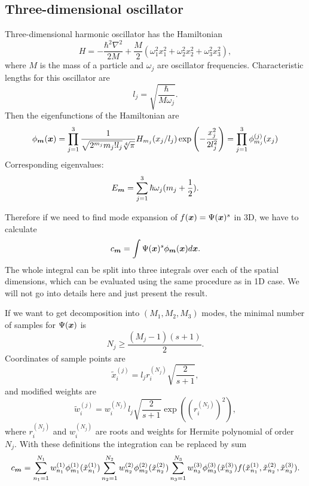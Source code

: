 \subsection{Three-dimensional oscillator}

Three-dimensional harmonic oscillator has the Hamiltonian
\[
	H = -\frac{\hbar^2 \nabla^2}{2 M}
		+ \frac{M}{2} (
			\omega_1^2 x_1^2 + \omega_2^2 x_2^2 + \omega_3^2 x_3^2
		),
\]
where $M$ is the mass of a particle and $\omega_j$ are oscillator frequencies.
Characteristic lengths for this oscillator are
\[
	l_j = \sqrt{\frac{\hbar}{M \omega_j}}.
\]
Then the eigenfunctions of the Hamiltonian are
\[
	\phi_{\boldsymbol{m}} (\boldsymbol{x})
	= \prod_{j=1}^3
		\frac{1}{\sqrt{2^{m_j} m_j! l_j} \sqrt[4]{\pi}} H_{m_j}(x_j / l_j)
		\exp \left( -\frac{x_j^2}{2 l_j^2} \right)
	= \prod_{j=1}^3 \phi_{m_j}^{(j)} (x_j)
\]
Corresponding eigenvalues:
\[
	E_{\boldsymbol{m}} = \sum_{j=1}^3 \hbar \omega_j (m_j + \frac{1}{2}).
\]

Therefore if we need to find mode expansion of $f(\boldsymbol{x}) = \Psi(\boldsymbol{x})^s$ in 3D, we have to calculate
\[
	c_{\boldsymbol{m}} = \int \Psi(\boldsymbol{x})^s \phi_{\boldsymbol{m}}(\boldsymbol{x}) d\boldsymbol{x}.
\]
The whole integral can be split into three integrals over each of the spatial dimensions,
which can be evaluated using the same procedure as in 1D case.
We will not go into details here and just present the result.

If we want to get decomposition into $(M_1, M_2, M_3)$ modes,
the minimal number of samples for $\Psi(\boldsymbol{x})$ is
\[
	N_j \ge \frac{(M_j - 1)(s + 1)}{2}.
\]
Coordinates of sample points are
\[
	\tilde{x}_{i}^{(j)} = l_j r_i^{(N_j)} \sqrt{\frac{2}{s+1}},
\]
and modified weights are
\[
	\tilde{w}_{i}^{(j)} = w_i^{(N_j)} l_j \sqrt{\frac{2}{s+1}} \exp((r_i^{(N_j)})^2),
\]
where $r_i^{(N_j)}$ and $w_i^{(N_j)}$ are roots and weights for Hermite polynomial of order $N_j$.
With these definitions the integration can be replaced by sum
\[
	c_{\boldsymbol{m}}
	= \sum_{n_1=1}^{N_1} w_{n_1}^{(1)} \phi_{m_1}^{(1)} (\tilde{x}_{n_1}^{(1)})
		\sum_{n_2=1}^{N_2} w_{n_2}^{(2)} \phi_{m_2}^{(2)} (\tilde{x}_{n_2}^{(2)})
		\sum_{n_3=1}^{N_3} w_{n_3}^{(3)} \phi_{m_3}^{(3)} (\tilde{x}_{n_3}^{(3)})
		f(\tilde{x}_{n_1}^{(1)}, \tilde{x}_{n_2}^{(2)}, \tilde{x}_{n_3}^{(3)}).
\]

